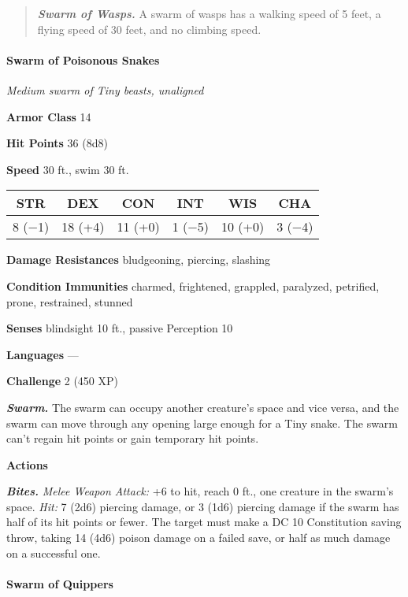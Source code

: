 \documentclass[
]{article}
\begin{document}
\begin{quote}
\emph{\textbf{Swarm of Wasps.}} A swarm of wasps has a walking speed of
5 feet, a flying speed of 30 feet, and no climbing speed.
\end{quote}

\hypertarget{swarm-of-poisonous-snakes}{%
\paragraph{Swarm of Poisonous Snakes}\label{swarm-of-poisonous-snakes}}

\emph{Medium swarm of Tiny beasts, unaligned}

\textbf{Armor Class} 14

\textbf{Hit Points} 36 (8d8)

\textbf{Speed} 30 ft., swim 30 ft.

\begin{longtable}[]{@{}cccccc@{}}
\toprule
STR & DEX & CON & INT & WIS & CHA\tabularnewline
\midrule
\endhead
8 (−1) & 18 (+4) & 11 (+0) & 1 (−5) & 10 (+0) & 3 (−4)\tabularnewline
\bottomrule
\end{longtable}

\textbf{Damage Resistances} bludgeoning, piercing, slashing

\textbf{Condition Immunities} charmed, frightened, grappled, paralyzed,
petrified, prone, restrained, stunned

\textbf{Senses} blindsight 10 ft., passive Perception 10

\textbf{Languages} ---

\textbf{Challenge} 2 (450 XP)

\emph{\textbf{Swarm.}} The swarm can occupy another creature's space and
vice versa, and the swarm can move through any opening large enough for
a Tiny snake. The swarm can't regain hit points or gain temporary hit
points.

\textbf{Actions}

\emph{\textbf{Bites.}} \emph{Melee Weapon Attack:} +6 to hit, reach 0
ft., one creature in the swarm's space. \emph{Hit:} 7 (2d6) piercing
damage, or 3 (1d6) piercing damage if the swarm has half of its hit
points or fewer. The target must make a DC 10 Constitution saving throw,
taking 14 (4d6) poison damage on a failed save, or half as much damage
on a successful one.

\hypertarget{swarm-of-quippers}{%
\paragraph{Swarm of Quippers}\label{swarm-of-quippers}}
\end{document}
